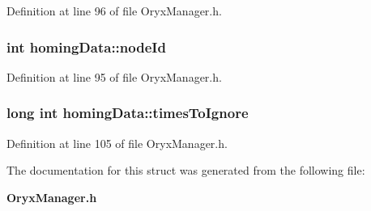 \-Definition at line 96 of file \-Oryx\-Manager.\-h.

\subsubsection[{node\-Id}]{\setlength{\rightskip}{0pt plus 5cm}int {\bf homing\-Data\-::node\-Id}}\label{structhomingData_a4e9d11535eb6804cb1cadbb97d2c4d8b}


\-Definition at line 95 of file \-Oryx\-Manager.\-h.

\subsubsection[{times\-To\-Ignore}]{\setlength{\rightskip}{0pt plus 5cm}long int {\bf homing\-Data\-::times\-To\-Ignore}}\label{structhomingData_a49fbb4c82274dbcb4f18ffe252ed9740}


\-Definition at line 105 of file \-Oryx\-Manager.\-h.



\-The documentation for this struct was generated from the following file\-:\begin{DoxyCompactItemize}
\item 
{\bf \-Oryx\-Manager.\-h}\end{DoxyCompactItemize}
